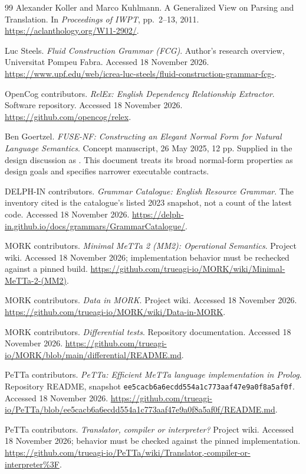 \documentclass[11pt,a4paper]{article}
\begin{document}
\begin{thebibliography}{99}
Alexander Koller and Marco Kuhlmann.
A Generalized View on Parsing and Translation.
In \emph{Proceedings of IWPT}, pp.\ 2--13, 2011.
\url{https://aclanthology.org/W11-2902/}.

Luc Steels.
\emph{Fluid Construction Grammar (FCG)}.
Author's research overview, Universitat Pompeu Fabra.
Accessed 18 November 2026.
\url{https://www.upf.edu/web/icrea-luc-steels/fluid-construction-grammar-fcg-}.

OpenCog contributors.
\emph{RelEx: English Dependency Relationship Extractor}.
Software repository. Accessed 18 November 2026.
\url{https://github.com/opencog/relex}.

Ben Goertzel.
\emph{FUSE-NF: Constructing an Elegant Normal Form for Natural Language
Semantics}.
Concept manuscript, 26 May 2025, 12 pp. Supplied in the design discussion
as . This document treats its broad
normal-form properties as design goals and specifies narrower executable
contracts.

DELPH-IN contributors.
\emph{Grammar Catalogue: English Resource Grammar}.
The inventory cited is the catalogue's listed 2023 snapshot, not a count
of the latest code. Accessed 18 November 2026.
\url{https://delph-in.github.io/docs/grammars/GrammarCatalogue/}.

MORK contributors.
\emph{Minimal MeTTa 2 (MM2): Operational Semantics}.
Project wiki. Accessed 18 November 2026; implementation behavior must be
rechecked against a pinned build.
\url{https://github.com/trueagi-io/MORK/wiki/Minimal-MeTTa-2-(MM2)}.

MORK contributors.
\emph{Data in MORK}.
Project wiki. Accessed 18 November 2026.
\url{https://github.com/trueagi-io/MORK/wiki/Data-in-MORK}.

MORK contributors.
\emph{Differential tests}.
Repository documentation. Accessed 18 November 2026.
\url{https://github.com/trueagi-io/MORK/blob/main/differential/README.md}.

PeTTa contributors.
\emph{PeTTa: Efficient MeTTa language implementation in Prolog}.
Repository README, snapshot
\texttt{ee5cacb6a6ecdd554a1c773aaf47e9a0f8a5af0f}.
Accessed 18 November 2026.
\url{https://github.com/trueagi-io/PeTTa/blob/ee5cacb6a6ecdd554a1c773aaf47e9a0f8a5af0f/README.md}.

PeTTa contributors.
\emph{Translator, compiler or interpreter?}
Project wiki. Accessed 18 November 2026; behavior must be checked against
the pinned implementation.
\url{https://github.com/trueagi-io/PeTTa/wiki/Translator,-compiler-or-interpreter\%3F}.


\end{thebibliography}
\end{document}
